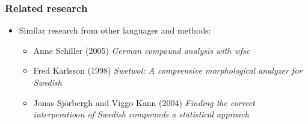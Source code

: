 \documentclass[utf8]{beamer}
\begin{document}
\begin{frame}
\frametitle{Related research}
\begin{itemize}
\item Similar research from other languages and methods:
\begin{itemize}
\item Anne Schiller (2005) \emph{German compound analysis with \emph{wfsc}}
\item Fred Karlsson (1998) \emph{Swetwol: A comprensive morphological analyzer for Swedish}
\item Jonas Sjörbergh and Viggo Kann (2004) \emph{Finding the correct interperatioon of Swedish compounds a statistical approach}
\end{itemize}
\end{itemize}
\end{frame}
\end{document}
